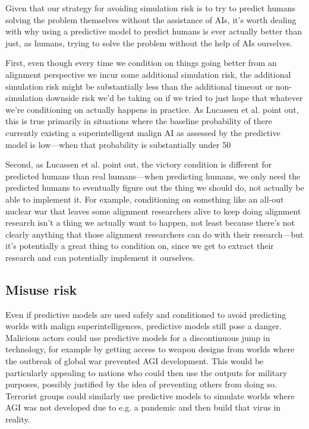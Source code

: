 {{Given that our strategy for avoiding simulation risk is to try to predict humans solving the problem themselves without the assistance of AIs, it's worth dealing with why using a predictive model to predict humans is ever actually better than just, as humans, trying to solve the problem without the help of AIs ourselves.

First, even though every time we condition on things going better from an alignment perspective we incur some additional simulation risk, the additional simulation risk might be substantially less than the additional timeout or non-simulation downside risk we'd be taking on if we tried to just hope that whatever we're conditioning on actually happens in practice. As Lucassen et al. point out, this is true primarily in situations where the baseline probability of there currently existing a superintelligent malign AI as assessed by the predictive model is low---when that probability is substantially under 50%

Second, as Lucassen et al. point out, the victory condition is different for predicted humans than real humans---when predicting humans, we only need the predicted humans to eventually figure out the thing we should do, not actually be able to implement it. For example, conditioning on something like an all-out nuclear war that leaves some alignment researchers alive to keep doing alignment research isn't a thing we actually want to happen, not least because there's not clearly anything that those alignment researchers can do with their research---but it's potentially a great thing to condition on, since we get to extract their research and can potentially implement it ourselves.


\subsection{Misuse risk}

Even if predictive models are used safely and conditioned to avoid predicting worlds with malign superintelligences, predictive models still pose a danger. Malicious actors could use predictive models for a discontinuous jump in technology, for example by getting access to weapon designs from worlds where the outbreak of global war prevented AGI development. This would be particularly appealing to nations who could then use the outputs for military purposes, possibly justified by the idea of preventing others from doing so. Terrorist groups could similarly use predictive models to simulate worlds where AGI was not developed due to e.g. a pandemic and then build that virus in reality.

}}
